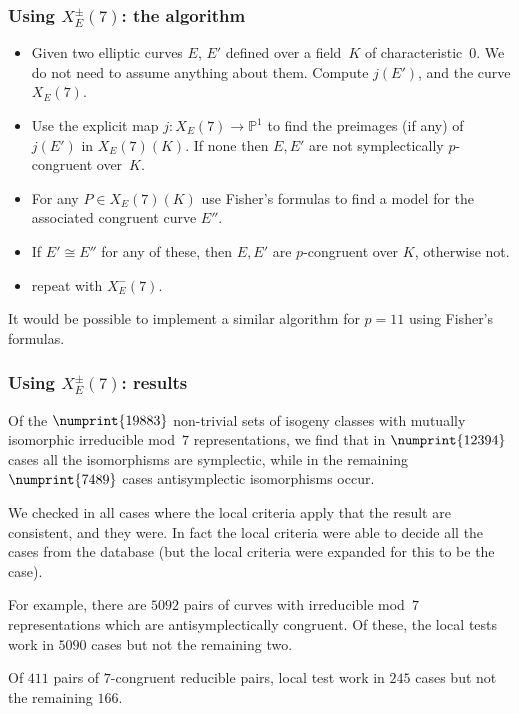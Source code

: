 \documentclass[handout]{beamer}
\newcommand{\PP}{\mathbb P}
\begin{document}
\begin{frame}\frametitle{Using $X_E^{\pm}(7)$: the algorithm}
\begin{itemize}
\item Given two elliptic curves $E$, $E'$ defined over a field~$K$ of
  characteristic~$0$. We do not need to assume anything about them.
  Compute $j(E')$, and the curve $X_E(7)$.
\item Use the explicit map $j:X_E(7)\to\PP^1$ to find the preimages
  (if any) of $j(E')$ in $X_E(7)(K)$.  If none then $E,E'$ are not
  symplectically $p$-congruent over~$K$.
\item For any $P\in X_E(7)(K)$ use Fisher's formulas to find a model
  for the associated congruent curve $E''$.
\item If $E'\cong E''$ for any of these, then $E,E'$ are $p$-congruent
  over $K$, otherwise not.
\item repeat with $X_E^-(7)$.
\end{itemize}
\pause
It would be possible to implement a similar algorithm for $p=11$ using
Fisher's formulas.
\end{frame}

\begin{frame}\frametitle{Using $X_E^{\pm}(7)$: results}
Of the $\numprint{19883}$ non-trivial sets of isogeny classes with mutually
isomorphic irreducible mod~$7$ representations, we find that in
$\numprint{12394}$ cases all the isomorphisms are symplectic, while in the
remaining $\numprint{7489}$ cases antisymplectic isomorphisms occur.

We checked in all cases where the local criteria apply that the result
are consistent, and they were.  In fact the local criteria were able
to decide all the cases from the database (but the local criteria were
expanded for this to be the case).

For example, there are $5092$ pairs of curves with irreducible mod~$7$
representations which are antisymplectically congruent.  Of these, the
local tests work in $5090$ cases but not the remaining two.

Of $411$ pairs of $7$-congruent reducible pairs, local test work in
$245$ cases but not the remaining $166$.
\end{frame}
\end{document}

